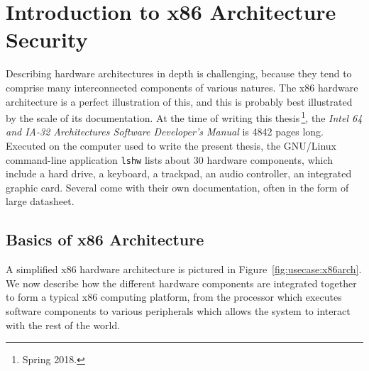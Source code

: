\section{Introduction to x86 Architecture Security}
\label{sec:usecase:architecture}

Describing hardware architectures in depth is challenging, because they tend to
comprise many interconnected components of various natures.
%
The x86 hardware architecture is a perfect illustration of this, and this is
probably best illustrated by the scale of its documentation.
%
At the time of writing this thesis\,\footnote{Spring 2018.}, the \emph{Intel 64
  and IA-32 Architectures Software Developer’s Manual} is 4842 pages long.
%
Executed on the computer used to write the present thesis, the GNU/Linux
command-line application \texttt{lshw} lists about 30 hardware components, which include a hard drive, a keyboard, a trackpad, an audio controller, an
integrated graphic card. Several come with their own documentation, often
in the form of large datasheet.

\subsection{Basics of x86 Architecture}

A simplified x86 hardware architecture is pictured in
Figure~\ref{fig:usecase:x86arch}.
%
We now describe how the different hardware components are integrated together to
form a typical x86 computing platform, from the processor which executes
software components to various peripherals which allows the system to interact
with the rest of the world.

